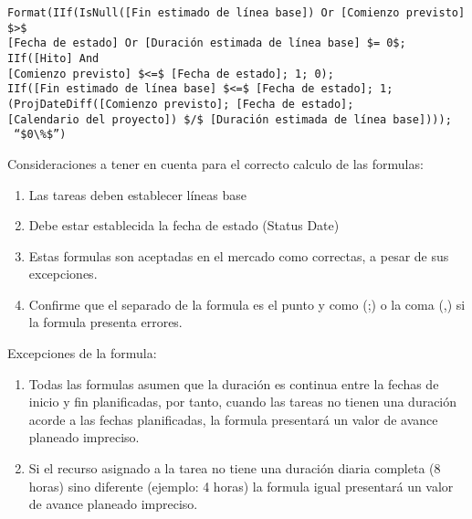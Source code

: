 \documentclass[11pt]{article} %
\begin{document}
\begin{verbatim}
Format(IIf(IsNull([Fin estimado de línea base]) Or [Comienzo previsto] $>$ 
[Fecha de estado] Or [Duración estimada de línea base] $= 0$; IIf([Hito] And 
[Comienzo previsto] $<=$ [Fecha de estado]; 1; 0); 
IIf([Fin estimado de línea base] $<=$ [Fecha de estado]; 1; 
(ProjDateDiff([Comienzo previsto]; [Fecha de estado]; 
[Calendario del proyecto]) $/$ [Duración estimada de línea base])));
 “$0\%$”)
\end{verbatim}

Consideraciones a tener en cuenta para el correcto calculo de las formulas:
\begin{enumerate}
\item Las tareas deben establecer líneas base
\item Debe estar establecida la fecha de estado (Status Date)
\item Estas formulas son aceptadas en el mercado como correctas, a pesar de sus excepciones.
\item Confirme que el separado de la formula es el punto y como (;) o la coma (,) si la formula presenta errores.
\end{enumerate}

Excepciones de la formula:
\begin{enumerate}
\item Todas las formulas asumen que la duración es continua entre la fechas de inicio y fin planificadas, por tanto, cuando las tareas no tienen una duración acorde a las fechas planificadas, la formula presentará un valor de avance planeado impreciso.
\item Si el recurso asignado a la tarea no tiene una duración diaria completa (8 horas) sino diferente (ejemplo: 4 horas) la formula igual presentará un valor de avance planeado impreciso.
\end{enumerate}
	
\end{document}
